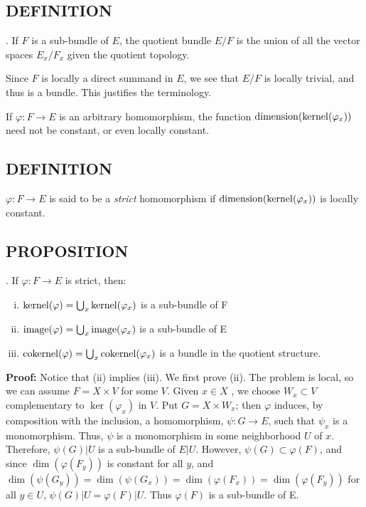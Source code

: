 \subsection{DEFINITION}. If $F$ is a sub-bundle of $E$, the quotient bundle $E/F$ is the union of all the vector spaces $E_x/F_x$ given the quotient topology. \par 

Since $F$ is locally a direct summand in $E$, we see that $E/F$ is locally trivial, and thus is a bundle. This justifies the terminology. \par 

If $\varphi: F \to E$ is an arbitrary homomorphism, the function $\operatorname{dimension}(\operatorname{kernel}(\varphi_x))$ need not be constant, or even locally constant. \par 

\subsection{DEFINITION} $\varphi: F \to E$ is said to be a \textit{strict} homomorphism if $\operatorname{dimension}(\operatorname{kernel}(\varphi_x))$ is locally constant. \par 

\subsection{PROPOSITION}. If $\varphi: F \to E$ is strict, then:
\begin{enumerate}[(i)]
\item $\operatorname{kernel}(\varphi) = \bigcup_x \operatorname{kernel}(\varphi_x)$ is a sub-bundle of F
\item $\operatorname{image}(\varphi) = \bigcup_x \operatorname{image}(\varphi_x)$ is a sub-bundle of E
\item $\operatorname{cokernel}(\varphi) = \bigcup_x \operatorname{cokernel}(\varphi_x)$ is a bundle in the quotient structure.
\end{enumerate}

\textbf{Proof:} Notice that (ii) implies (iii). We first prove (ii). The problem is local, so we can assume $F = X \times V$ for some $V$. Given $x \in X$ , we choose $W_x \subset V$ complementary to $\ker(\varphi_x)$ in $V$. Put $G = X \times W_x$; then $\varphi$ induces, by composition with the inclusion, a homomorphism, $\psi: G \to E$, such that $\psi_x$ is a monomorphism. Thus, $\psi$ is a monomorphism in some neighborhood $U$ of $x$. Therefore, $\psi(G) \vert U$ is a sub-bundle of $E \vert U$. However, $\psi(G) \subset \varphi(F)$, and since $\dim(\varphi(F_y))$ is constant for all $y$, and $\dim(\psi(G_y)) = \dim(\psi(G_x)) = \dim(\varphi(F_x)) = \dim(\varphi(F_y))$ for all $y \in U$, $\psi(G) \vert U = \varphi(F) \vert U$. Thus $\varphi(F)$ is a sub-bundle of E. \par 

